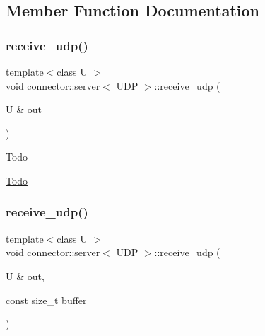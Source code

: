 \subsection{Member Function Documentation}
\mbox{\label{classconnector_1_1server_3_01UDP_01_4_a98b7f94a6d4843e115c6fe32e3a2f4bd}} 
\subsubsection{\texorpdfstring{receive\+\_\+udp()}{receive\_udp()}\hspace{0.1cm}{\footnotesize\ttfamily [1/2]}}
{\footnotesize\ttfamily template$<$class U $>$ \\
void \hyperlink{classconnector_1_1server}{connector\+::server}$<$ U\+DP $>$\+::receive\+\_\+udp (\begin{DoxyParamCaption}\item[{U \&}]{out }\end{DoxyParamCaption})\hspace{0.3cm}{\ttfamily [inline]}}

\begin{DoxyRefDesc}{Todo}
\item[\hyperlink{todo__todo000014}{Todo}]\end{DoxyRefDesc}
\mbox{\label{classconnector_1_1server_3_01UDP_01_4_af6b853682811e4bd66c4223215cb8e75}} 
\subsubsection{\texorpdfstring{receive\+\_\+udp()}{receive\_udp()}\hspace{0.1cm}{\footnotesize\ttfamily [2/2]}}
{\footnotesize\ttfamily template$<$class U $>$ \\
void \hyperlink{classconnector_1_1server}{connector\+::server}$<$ U\+DP $>$\+::receive\+\_\+udp (\begin{DoxyParamCaption}\item[{U \&}]{out,  }\item[{const size\+\_\+t}]{buffer }\end{DoxyParamCaption})\hspace{0.3cm}{\ttfamily [inline]}}

